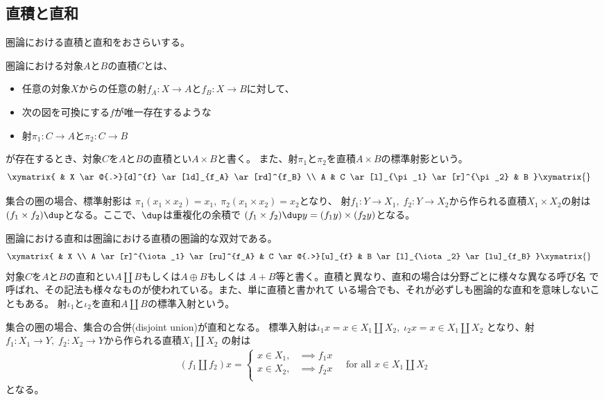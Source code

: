 \subsection{直積と直和}\label{s2:直積と直和} %
	圏論における直積と直和をおさらいする。

	圏論における対象$A$と$B$の直積$C$とは、
	\begin{itemize}\setlength{\itemsep}{-1mm} %
		\item 任意の対象$X$からの任意の射$f_A:X\to A$と$f_B:X\to B$に対して、
		\item 次の図を可換にする$f$が唯一存在するような
		\item 射$\pi_1:C\to A$と$\pi_2:C\to B$
	\end{itemize} %
	が存在するとき、対象$C$を$A$と$B$の直積とい$A\times B$と書く。
	また、射$\pi_1$と$\pi_2$を直積$A\times B$の標準射影という。
	\begin{equation*}\begin{split} %
		\xymatrix{
			& X \ar@{.>}[d]^{f} \ar[ld]_{f_A} \ar[rd]^{f_B} \\
			A & C \ar[l]_{\pi_1} \ar[r]^{\pi_2} & B
		} & \xymatrix{
		}
	\end{split}\end{equation*} %

	集合の圏の場合、標準射影は
	$\pi_1(x_1\times x_2)=x_1,\;\pi_2(x_1\times x_2)=x_2$となり、
	射$f_1:Y\to X_1,\;f_2:Y\to X_2$から作られる直積$X_1\times X_2$の射は
	$(f_1\times f_2)\dup$となる。ここで、$\dup$は重複化の余積で
	$(f_1\times f_2)\dup y=(f_1y)\times(f_2y)$となる。

	圏論における直和は圏論における直積の圏論的な双対である。
	\begin{equation*}\begin{split} %
		\xymatrix{
			& X \\
			A \ar[r]^{\iota_1} \ar[ru]^{f_A} & C \ar@{.>}[u]_{f} 
			& B \ar[l]_{\iota_2} \ar[lu]_{f_B}
		} & \xymatrix{
		}
	\end{split}\end{equation*} %
	対象$C$を$A$と$B$の直和とい$A\amalg B$もしくは$A\oplus B$もしくは
	$A+B$等と書く。直積と異なり、直和の場合は分野ごとに様々な異なる呼び名
	で呼ばれ、その記法も様々なものが使われている。また、単に直積と書かれて
	いる場合でも、それが必ずしも圏論的な直和を意味しないこともある。
	射$\iota_1$と$\iota_2$を直和$A\amalg B$の標準入射という。

	集合の圏の場合、集合の合併(disjoint union)が直和となる。
	標準入射は$\iota_1x=x\in X_1\amalg X_2,\;\iota_2x=x\in X_1\amalg X_2$
	となり、射$f_1:X_1\to Y,\;f_2:X_2\to Y$から作られる直積$X_1\amalg X_2$
	の射は
	\begin{equation*}\begin{split} %
		(f_1\amalg f_2)x = \begin{cases}
			x\in X_1, &\implies f_1x \\
			x\in X_2, &\implies f_2x \\
		\end{cases}\quad\text{for all }x\in X_1\amalg X_2
	\end{split}\end{equation*} %
	となる。
